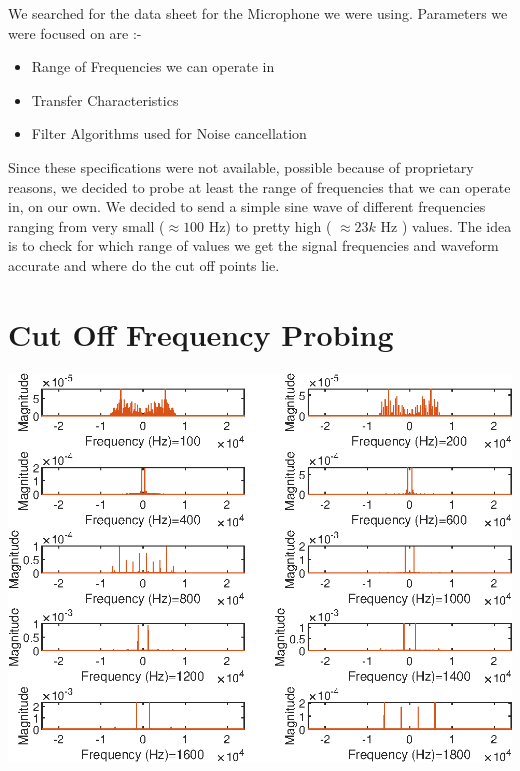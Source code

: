 \documentclass{report}
\begin{document}
We searched for the data sheet for the Microphone we were using. Parameters we were focused on are :-
\begin{itemize}
    \item Range of Frequencies we can operate in
    \item Transfer Characteristics
    \item Filter Algorithms used for Noise cancellation
\end{itemize}

Since these specifications were not available, possible because of proprietary reasons, we decided to probe at least the range of frequencies that we can operate in, on our own. We decided to send a simple sine wave of different frequencies ranging from very small ($\approx 100$ Hz) to pretty high ( $\approx  23k$ Hz ) values. The idea is to check for which range of values we get the signal frequencies and waveform accurate and where do the cut off points lie. 






\section{Cut Off Frequency Probing}



\includegraphics[width=1\linewidth]{first_10.eps}
\end{document}
